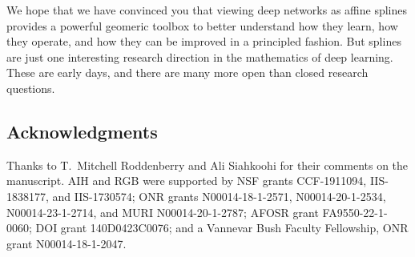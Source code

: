 \documentclass{notices}
\begin{document}
We hope that we have convinced you that viewing deep networks as affine splines provides a powerful geomeric toolbox to better understand how they learn, how they operate, and how they can be improved in a principled fashion.
But splines are just one interesting research direction in the mathematics of deep learning.
These are early days, and there are many more open than closed research questions.

\subsection*{Acknowledgments}


Thanks to T.\ Mitchell Roddenberry and Ali Siahkoohi for their comments on the manuscript.
AIH and RGB were supported by NSF grants CCF-1911094, IIS-1838177, and IIS-1730574; ONR grants N00014-18-1-2571, N00014-20-1-2534, N00014-23-1-2714, and MURI N00014-20-1-2787; AFOSR grant FA9550-22-1-0060; DOI grant 140D0423C0076; and a Vannevar Bush Faculty Fellowship, ONR grant N00014-18-1-2047.



\end{document}
